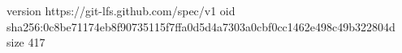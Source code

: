 version https://git-lfs.github.com/spec/v1
oid sha256:0c8be71174eb8f90735115f7ffa0d5d4a7303a0cbf0cc1462e498c49b322804d
size 417
